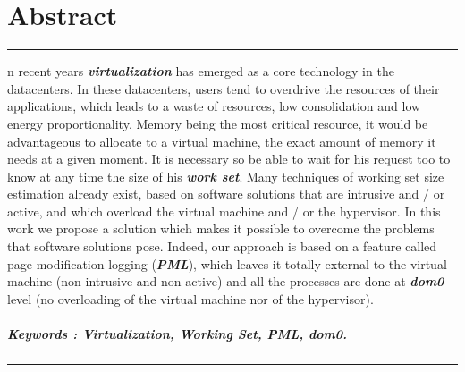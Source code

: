 %
%
%

\chapter*{Abstract}
{
\noindent\rule[3pt]{\textwidth}{1pt}
\vspace{.2cm}

n recent years \textbf{\emph{virtualization}} has emerged as a core technology in the datacenters. In these datacenters, users tend to overdrive the resources of their applications, which leads to a waste of resources, low consolidation and low energy proportionality. Memory being the most critical resource, it would be advantageous to allocate to a virtual machine, the exact amount of memory it needs at a given moment. It is necessary so be able to wait for his request too to know at any time the size of his \textbf{\emph{work set}}. Many techniques of working set size estimation already exist, based on software solutions that are intrusive and / or active, and which overload the virtual machine and / or the hypervisor. In this work we propose a solution which makes it possible to overcome the problems that software solutions pose. Indeed, our approach is based on a feature called page modification logging (\textbf{\emph{PML}}), which leaves it totally external to the virtual machine (non-intrusive and non-active) and all the processes are done at \textbf{\emph{dom0}} level (no overloading of the virtual machine nor of the hypervisor).

\paragraph{Keywords : Virtualization, Working Set, PML, dom0.}

\vspace{.2cm}
\noindent\rule[3pt]{\textwidth}{1pt}
}
\clearpage